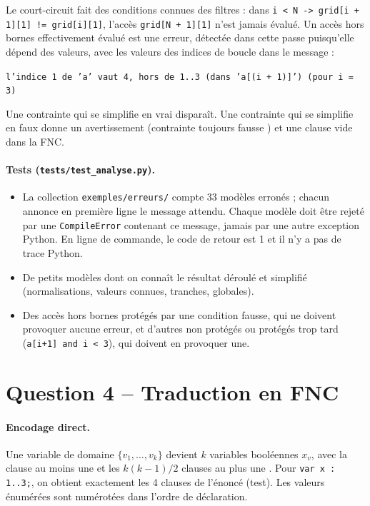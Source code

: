 \documentclass[11pt,a4paper]{article}
\newcommand{\code}[1]{\texttt{#1}}
\begin{document}
Le court-circuit fait des conditions connues des filtres : dans
\code{i < N -> grid[i + 1][1] != grid[i][1]}, l'accès \code{grid[N + 1][1]} n'est jamais
évalué. Un accès hors bornes effectivement évalué est une erreur, détectée dans cette passe
puisqu'elle dépend des valeurs, avec les valeurs des indices de boucle dans le message :
\begin{center}
\code{l'indice 1 de 'a' vaut 4, hors de 1..3 (dans 'a[(i + 1)]') (pour i = 3)}
\end{center}
Une contrainte qui se simplifie en vrai disparaît. Une contrainte qui se simplifie en faux
donne un avertissement (\og contrainte toujours fausse \fg) et une clause vide dans la FNC.

\paragraph{Tests (\code{tests/test\_analyse.py}).}
\begin{itemize}
  \item La collection \code{exemples/erreurs/} compte 33 modèles erronés ; chacun annonce en
        première ligne le message attendu. Chaque modèle doit être rejeté par une
        \code{CompileError} contenant ce message, jamais par une autre exception Python. En
        ligne de commande, le code de retour est 1 et il n'y a pas de trace Python.
  \item De petits modèles dont on connaît le résultat déroulé et simplifié (normalisations,
        valeurs connues, tranches, globales).
  \item Des accès hors bornes protégés par une condition fausse, qui ne doivent provoquer
        aucune erreur, et d'autres non protégés ou protégés trop tard (\code{a[i+1] and i < 3}),
        qui doivent en provoquer une.
\end{itemize}

\section{Question 4 -- Traduction en FNC}

\paragraph{Encodage direct.} Une variable de domaine $\{v_1,\dots,v_k\}$ devient $k$
variables booléennes $x_{v}$, avec la clause \og au moins une \fg{} et les $k(k-1)/2$ clauses
\og au plus une \fg. Pour \code{var x : 1..3;}, on obtient exactement les 4 clauses de
l'énoncé (test). Les valeurs énumérées sont numérotées dans l'ordre de déclaration.
\end{document}
